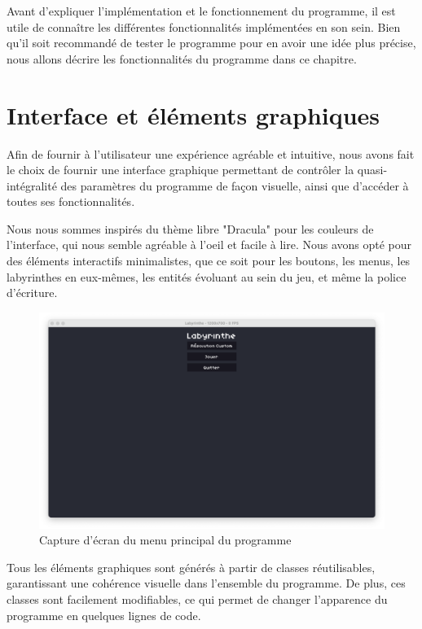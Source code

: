 \documentclass[12pt]{scrreprt} %
\begin{document}
Avant d'expliquer l'implémentation et le fonctionnement du programme, il est utile de connaître les différentes fonctionnalités implémentées en son sein. Bien qu'il soit recommandé de tester le programme pour en avoir une idée plus précise, nous allons décrire les fonctionnalités du programme dans ce chapitre.

\section{Interface et éléments graphiques}

Afin de fournir à l'utilisateur une expérience agréable et intuitive, nous avons fait le choix de fournir une interface graphique permettant de contrôler la quasi-intégralité des paramètres du programme de façon visuelle, ainsi que d'accéder à toutes ses fonctionnalités.

Nous nous sommes inspirés du thème libre "Dracula"\cite{Dracula2024} pour les couleurs de l'interface, qui nous semble agréable à l'oeil et facile à lire. Nous avons opté pour des éléments interactifs minimalistes, que ce soit pour les boutons, les menus, les labyrinthes en eux-mêmes, les entités évoluant au sein du jeu, et même la police d'écriture.



\begin{figure}[h]
    \centering
    \includegraphics[width=\textwidth]{images/mainmenu.png}
    \caption{Capture d'écran du menu principal du programme}
\end{figure}

Tous les éléments graphiques sont générés à partir de classes réutilisables, garantissant une cohérence visuelle dans l'ensemble du programme. De plus, ces classes sont facilement modifiables, ce qui permet de changer l'apparence du programme en quelques lignes de code.
\end{document}
